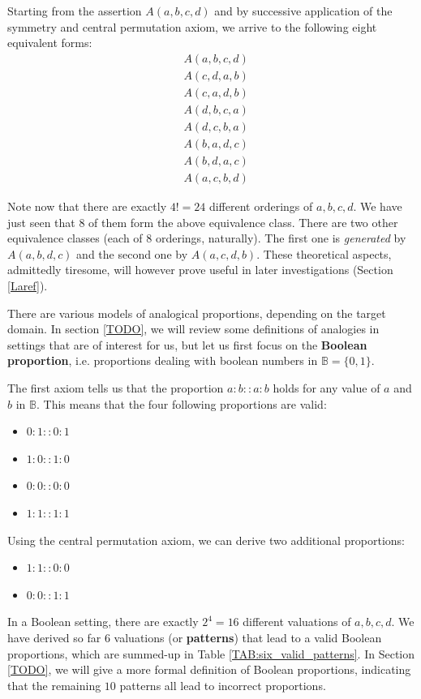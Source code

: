 Starting from the assertion $A(a, b, c, d)$ and by successive application of
the symmetry and central permutation axiom, we arrive to the following eight
equivalent forms:
\begin{align*}
  &A(a, b, c, d)\\
  &A(c, d, a, b)\\
  &A(c, a, d, b)\\
  &A(d, b, c, a)\\
  &A(d, c, b, a)\\
  &A(b, a, d, c)\\
  &A(b, d, a, c)\\
  &A(a, c, b, d)
\end{align*}

Note now that there are exactly $4! = 24$ different orderings of $a, b, c, d$.
We have just seen that $8$ of them form the above equivalence class. There are
two other equivalence classes (each of $8$ orderings, naturally). The first one
is \textit{generated} by $A(a, b, d, c)$ and the second one by $A(a, c, d, b)$.
These theoretical aspects, admittedly tiresome, will however prove useful in
later investigations (Section \ref{Laref}).

There are various models of analogical proportions, depending on the target
domain. In section \ref{TODO}, we will review some definitions of analogies in
settings that are of interest for us, but let us first focus on the
\textbf{Boolean proportion}, i.e. proportions dealing with boolean numbers in
$\mathbb{B} = \{0, 1\}$.

The first axiom tells us that the proportion $a:b::a:b$ holds for any value of
$a$ and $b$ in $\mathbb{B}$. This means that the four following proportions are
valid:
\begin{itemize}
  \item $0 : 1 :: 0 :1$
  \item $1 : 0 :: 1 :0$
  \item $0 : 0 :: 0 :0$
  \item $1 : 1 :: 1 :1$
\end{itemize}

Using the central permutation axiom, we can derive two additional proportions:

\begin{itemize}
  \item $1 : 1 :: 0 : 0$
  \item $0 : 0 :: 1 : 1$
\end{itemize}

In a Boolean setting, there are exactly $2^4 = 16$ different valuations of $a,
b, c, d$. We have derived so far $6$ valuations (or \textbf{patterns}) that
lead to a valid Boolean proportions, which are summed-up in Table
\ref{TAB:six_valid_patterns}. In Section \ref{TODO}, we will give a more formal
definition of Boolean proportions, indicating that the remaining $10$ patterns
all lead to incorrect proportions.

